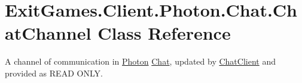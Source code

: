 \hypertarget{class_exit_games_1_1_client_1_1_photon_1_1_chat_1_1_chat_channel}{}\section{Exit\+Games.\+Client.\+Photon.\+Chat.\+Chat\+Channel Class Reference}
\label{class_exit_games_1_1_client_1_1_photon_1_1_chat_1_1_chat_channel}


A channel of communication in \hyperlink{namespace_exit_games_1_1_client_1_1_photon}{Photon} \hyperlink{namespace_exit_games_1_1_client_1_1_photon_1_1_chat}{Chat}, updated by \hyperlink{class_exit_games_1_1_client_1_1_photon_1_1_chat_1_1_chat_client}{Chat\+Client} and provided as R\+E\+AD O\+N\+LY.  


